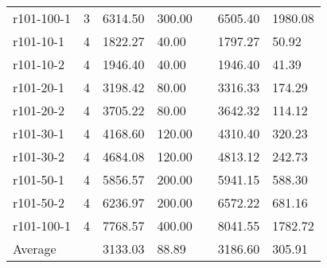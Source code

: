 \documentclass[final,5p,times,twocolumn]{elsarticle}
\begin{document}
{{{{{{{{\begin{table}[htbp]
\begin{tabular}{l l l l l l l}
r101-100-1&3&6314.50&300.00&&6505.40&1980.08\\
r101-10-1&4&1822.27&40.00&&1797.27&50.92\\
r101-10-2&4&1946.40&40.00&&1946.40&41.39\\
r101-20-1&4&3198.42&80.00&&3316.33&174.29\\
r101-20-2&4&3705.22&80.00&&3642.32&114.12\\
r101-30-1&4&4168.60&120.00&&4310.40&320.23\\
r101-30-2&4&4684.08&120.00&&4813.12&242.73\\
r101-50-1&4&5856.57&200.00&&5941.15&588.30\\
r101-50-2&4&6236.97&200.00&&6572.22&681.16\\
r101-100-1&4&7768.57&400.00&&8041.55&1782.72\\
\hline
Average&&3133.03&88.89&&3186.60&305.91\\
\hline
\end{tabular}
\label{tab:pt200_10}
\end{table}

}}}}}}}}
\end{document}
